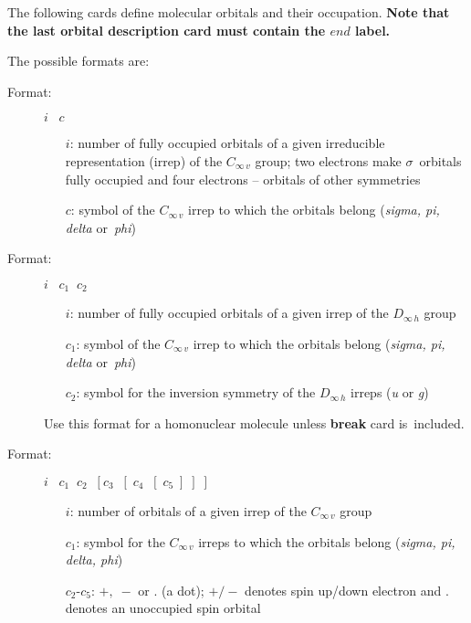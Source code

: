 \documentclass[12pt,a4paper]{article}
\begin{document}
\begin{description}
The following cards define molecular orbitals and their occupation.
\textbf{Note that the last orbital description card must contain the
  $end$ label.}

The possible formats are:
\begin{description} 
\item[Format:] $i\;\;\;c$ 
\begin{itemize} 
\item[$i$:] number of fully occupied orbitals of a given irreducible
     representation (irrep) of the $C_{\infty\,v}$ group;
	two electrons make $\sigma$~orbitals fully occupied
     and four electrons -- orbitals of other symmetries
\item[$c$:] symbol of the $C_{\infty\,v}$ irrep to which the orbitals
     belong ({\it sigma, pi, delta} or~{\it phi}) 
\end{itemize} 
\end{description} 


\begin{description} 
\item[Format:] $i\;\;\;c_1 \;\;c_2$ 
\begin{itemize} 
\item[$i$:] number of fully occupied orbitals of a given irrep of the
$D_{\infty\,h}$ group
\item[$c_1$:] symbol of the $C_{\infty\,v}$ irrep to which the orbitals belong
       ({\it sigma, pi, delta} or~{\it phi}) 
\item[$c_2$:] symbol for the inversion symmetry of the $D_{\infty\,h}$ irreps 
       ({\it u} or {\it g})
\end{itemize} 
Use this format for a homonuclear molecule unless \textbf{break} card
is~included.
\end{description} 


\begin{description} 
\item[Format:]
$i\;\;\;c_1\;\;c_2\;\;[c_3\;\;[\;c_4\;\;[\;c_5\;]\;]\;]$
\begin{itemize} 
\item[$i$:] number of orbitals of a given irrep of the $C_{\infty\,v}$  group
\item[$c_1$:] symbol for the $C_{\infty\,v}$ irreps to which the
orbitals belong ({\it sigma, pi, delta, phi})
\item[$c_2$-$c_5$:] $+,\;-$ or . (a dot); $+/-$ denotes spin up/down
electron and . denotes an unoccupied spin orbital
\end{itemize} 
\end{description} 


\end{description}
\end{document}
